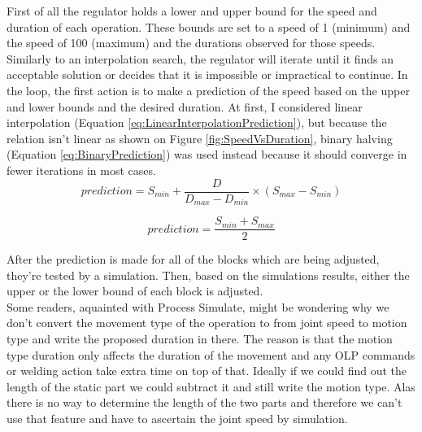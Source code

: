
First of all the regulator holds a lower and upper bound for the speed and duration of each operation. These bounds are set to a speed of 1 (minimum) and the speed of 100 (maximum) and the durations observed for those speeds. Similarly to an interpolation search, the regulator will iterate until it finds an acceptable solution or decides that it is impossible or impractical to continue. In the loop, the first action is to make a prediction of the speed based on the upper and lower bounds and the desired duration. At first, I considered linear interpolation (Equation \ref{eq:LinearInterpolationPrediction}), but because the relation isn't linear as shown on Figure \ref{fig:SpeedVsDuration}, binary halving (Equation \ref{eq:BinaryPrediction}) was used instead because it should converge in fewer iterations in most cases. \\

\begin{equation} \label{eq:LinearInterpolationPrediction}
    prediction = S_{min} + \frac{D}{D_{max}-D_{min}} \times (S_{max}-S_{min})
\end{equation}

\begin{equation} \label{eq:BinaryPrediction}
    prediction = \frac{S_{min} + S_{max}}{2}
\end{equation}

After the prediction is made for all of the blocks which are being adjusted, they're tested by a simulation. Then, based on the simulations results, either the upper or the lower bound of each block is adjusted. \\


Some readers, aquainted with Process Simulate, might be wondering why we don't convert the movement type of the operation to from joint speed to motion type and write the proposed duration in there. The reason is that the motion type duration only affects the duration of the movement and any OLP commands or welding action take extra time on top of that. Ideally if we could find out the length of the static part we could subtract it and still write the motion type. Alas there is no way to determine the length of the two parts and therefore we can't use that feature and have to ascertain the joint speed by simulation. \\

